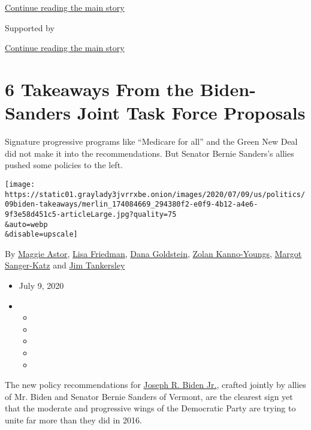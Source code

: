 \protect\hyperlink{after-top}{Continue reading the main story}

Supported by

\protect\hyperlink{after-sponsor}{Continue reading the main story}

\hypertarget{6-takeaways-from-the-biden-sanders-joint-task-force-proposals}{%
\section{6 Takeaways From the Biden-Sanders Joint Task Force
Proposals}\label{6-takeaways-from-the-biden-sanders-joint-task-force-proposals}}

Signature progressive programs like ``Medicare for all'' and the Green
New Deal did not make it into the recommendations. But Senator Bernie
Sanders's allies pushed some policies to the left.

\texttt{[image: https://static01.graylady3jvrrxbe.onion/images/2020/07/09/us/politics/09biden-takeaways/merlin\_174084669\_294380f2-e0f9-4b12-a4e6-9f3e58d451c5-articleLarge.jpg?quality=75\\\&auto=webp\\\&disable=upscale]}

By \href{https://www.nytimes3xbfgragh.onion/by/maggie-astor}{Maggie
Astor}, \href{https://www.nytimes3xbfgragh.onion/by/lisa-friedman}{Lisa
Friedman},
\href{https://www.nytimes3xbfgragh.onion/by/dana-goldstein}{Dana
Goldstein},
\href{https://www.nytimes3xbfgragh.onion/by/zolan-kanno-youngs}{Zolan
Kanno-Youngs},
\href{https://www.nytimes3xbfgragh.onion/by/margot-sanger-katz}{Margot
Sanger-Katz} and
\href{https://www.nytimes3xbfgragh.onion/by/jim-tankersley}{Jim
Tankersley}

\begin{itemize}
\item
  July 9, 2020
\item
  \begin{itemize}
  \item
  \item
  \item
  \item
  \item
  \end{itemize}
\end{itemize}

The new policy recommendations for
\href{https://www.nytimes3xbfgragh.onion/interactive/2020/us/elections/joe-biden.html}{Joseph
R. Biden Jr.}, crafted jointly by allies of Mr. Biden and Senator Bernie
Sanders of Vermont, are the clearest sign yet that the moderate and
progressive wings of the Democratic Party are trying to unite far more
than they did in 2016.

